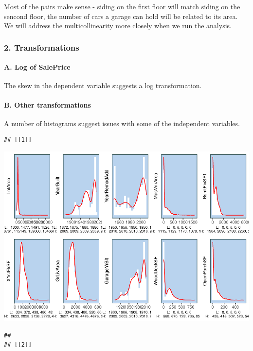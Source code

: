 \documentclass[
]{article}
\begin{document}
Most of the pairs make sense - siding on the first floor will match
siding on the sencond floor, the number of cars a garage can hold will
be related to its area. We will address the multicollinearity more
closely when we run the analysis.

\hypertarget{transformations}{%
\subsubsection{2. Transformations}\label{transformations}}

\hypertarget{a.-log-of-saleprice}{%
\paragraph{A. Log of SalePrice}\label{a.-log-of-saleprice}}

The skew in the dependent variable suggests a log transformation.

\hypertarget{b.-other-transformations}{%
\paragraph{B. Other transformations}\label{b.-other-transformations}}

A number of histograms suggest issues with some of the independent
variables.

\begin{verbatim}
## [[1]]
\end{verbatim}

\includegraphics{Eric_Hirsch_621_Final_HomePrices_files/figure-latex/unnamed-chunk-11-1.pdf}

\begin{verbatim}
## 
## [[2]]
\end{verbatim}
\end{document}
